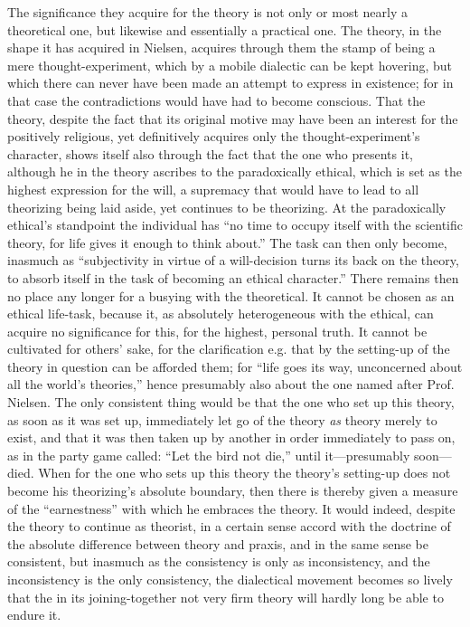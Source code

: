 \documentclass[12pt,a4paper]{book}
\begin{document}
The significance they acquire for the theory is not only or most nearly a theoretical one, but likewise
and essentially a practical one. The theory, in the shape it has acquired in Nielsen, acquires through
them the stamp of being a mere thought-experiment, which by a mobile dialectic can be kept hovering, but
which there can never have been made an attempt to express in existence; for in that case the
contradictions would have had to become conscious. That the theory, despite the fact that its original
motive may have been an interest for the positively religious, yet definitively acquires only the
thought-experiment's character, shows itself also through the fact that the one who presents it, although
he in the theory ascribes to the paradoxically ethical, which is set as the highest expression for the
will, a supremacy that would have to lead to all theorizing being laid aside, yet continues to be
theorizing. At the paradoxically ethical's standpoint the individual has ``no time to occupy itself with
the scientific theory, for life gives it enough to think about.'' The task can then only become, inasmuch
as ``subjectivity in virtue of a will-decision turns its back on the theory, to absorb itself in the task
of becoming an ethical character.'' There remains then no place any longer for a busying with the
theoretical. It cannot be chosen as an ethical life-task, because it, as absolutely heterogeneous with the
ethical, can acquire no significance for this, for the highest, personal truth. It cannot be cultivated
for others' sake, for the clarification e.g. that by the setting-up of the theory in question can be
afforded them; for ``life goes its way, unconcerned about all the world's theories,'' hence presumably
also about the one named after Prof. Nielsen. The only consistent thing would be that the one who set up
this theory, as soon as it was set up, immediately let go of the theory \emph{as} theory merely to exist,
and that it was then taken up by another in order immediately to pass on, as in the party game called:
``Let the bird not die,'' until it---presumably soon---died. When for the one who sets up this theory the
theory's setting-up does not become his theorizing's absolute boundary, then there is thereby given a
measure of the ``earnestness'' with which he embraces the theory. It would indeed, despite the theory to
continue as theorist, in a certain sense accord with the doctrine of the absolute difference between
theory and praxis, and in the same sense be consistent, but inasmuch as the consistency is only as
inconsistency, and the inconsistency is the only consistency, the dialectical movement becomes so lively
that the in its joining-together not very firm theory will hardly long be able to endure it.
\end{document}
